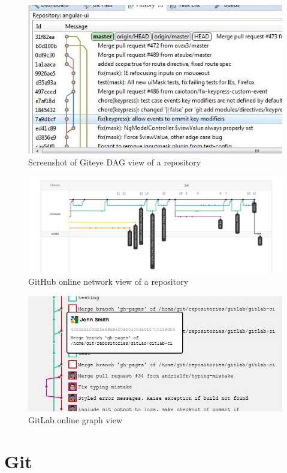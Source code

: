 \begin{figure}[htpb]
  \centering
  \includegraphics[width=0.8\linewidth]{Figures/introduction/giteye_graph.jpg}
  \caption{Screenshot of Giteye DAG view of a repository\cite{giteye}}
  \label{fig:giteye_screenshot}
\end{figure}

\begin{figure}[htpb]
  \centering
  \includegraphics[width=0.8\linewidth]{Figures/introduction/github_dag.png}
  \caption{GitHub online network view of a repository\cite{github}}
  \label{fig:github_dag_screenshot}
\end{figure}

\begin{figure}[htpb]
  \centering
  \includegraphics[width=0.8\linewidth]{Figures/introduction/gitlab_graph.jpg}
  \caption{GitLab online graph view\cite{gitlab}}
  \label{fig:gitlab_dag_screenshot}
\end{figure}

\section{Git}
\label{sec:git}

